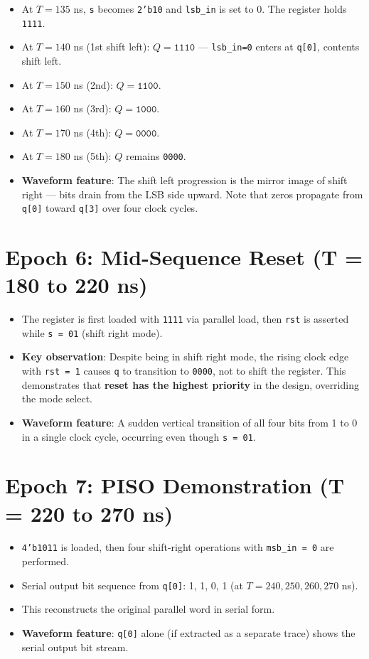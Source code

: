 \documentclass[12pt,a4paper]{report}
\newcommand{\signal}[1]{\texttt{\textcolor{codeblue}{#1}}}
\begin{document}
\begin{itemize}
    \item At $T = 135$ ns, \signal{s} becomes \texttt{2'b10} and \signal{lsb\_in} is set to 0. The register holds \texttt{1111}.
    \item At $T = 140$ ns (1st shift left): $Q = \texttt{1110}$ — \texttt{lsb\_in=0} enters at \signal{q[0]}, contents shift left.
    \item At $T = 150$ ns (2nd): $Q = \texttt{1100}$.
    \item At $T = 160$ ns (3rd): $Q = \texttt{1000}$.
    \item At $T = 170$ ns (4th): $Q = \texttt{0000}$.
    \item At $T = 180$ ns (5th): $Q$ remains \texttt{0000}.
    \item \textbf{Waveform feature}: The shift left progression is the mirror image of shift right — bits drain from the LSB side upward. Note that zeros propagate from \signal{q[0]} toward \signal{q[3]} over four clock cycles.
\end{itemize}

\section{Epoch 6: Mid-Sequence Reset (T = 180 to 220 ns)}

\begin{itemize}
    \item The register is first loaded with \texttt{1111} via parallel load, then \signal{rst} is asserted while \signal{s = 01} (shift right mode).
    \item \textbf{Key observation}: Despite being in shift right mode, the rising clock edge with \signal{rst = 1} causes \signal{q} to transition to \texttt{0000}, not to shift the register. This demonstrates that \textbf{reset has the highest priority} in the design, overriding the mode select.
    \item \textbf{Waveform feature}: A sudden vertical transition of all four bits from 1 to 0 in a single clock cycle, occurring even though \signal{s = 01}.
\end{itemize}

\section{Epoch 7: PISO Demonstration (T = 220 to 270 ns)}

\begin{itemize}
    \item \texttt{4'b1011} is loaded, then four shift-right operations with \signal{msb\_in = 0} are performed.
    \item Serial output bit sequence from \signal{q[0]}: 1, 1, 0, 1 (at $T = 240, 250, 260, 270$ ns).
    \item This reconstructs the original parallel word in serial form.
    \item \textbf{Waveform feature}: \signal{q[0]} alone (if extracted as a separate trace) shows the serial output bit stream.
\end{itemize}
\end{document}
